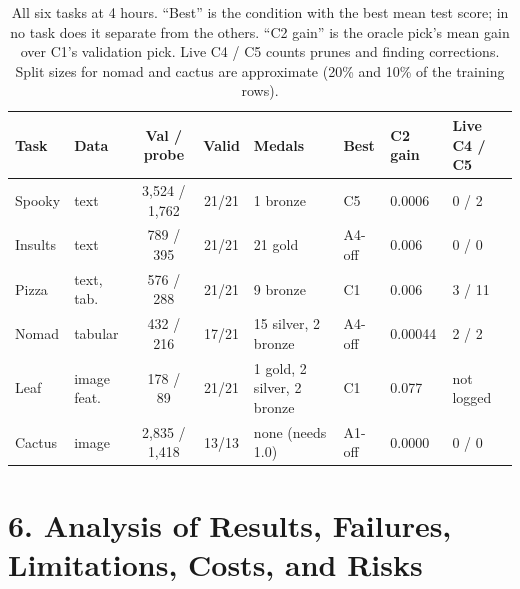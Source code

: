 \documentclass[11pt]{article}
\begin{document}
\begin{table}[tb]
\centering
\footnotesize
\begin{tabular}{@{}llccllll@{}}
\toprule
\textbf{Task} & \textbf{Data} & \textbf{Val / probe} & \textbf{Valid} & \textbf{Medals}
& \textbf{Best} & \textbf{C2 gain} & \textbf{Live C4 / C5} \\
\midrule
Spooky  & text       & 3,524 / 1,762 & 21/21 & 1 bronze            & C5     & 0.0006 & 0 / 2 \\
Insults & text       & 789 / 395     & 21/21 & 21 gold             & A4-off & 0.006  & 0 / 0 \\
Pizza   & text, tab. & 576 / 288     & 21/21 & 9 bronze            & C1     & 0.006  & 3 / 11 \\
Nomad   & tabular    & 432 / 216     & 17/21 & 15 silver, 2 bronze & A4-off & 0.00044 & 2 / 2 \\
Leaf    & image feat.& 178 / 89      & 21/21 & 1 gold, 2 silver, 2 bronze & C1 & 0.077 & not logged \\
Cactus  & image      & 2,835 / 1,418 & 13/13 & none (needs 1.0)    & A1-off & 0.0000 & 0 / 0 \\
\bottomrule
\end{tabular}
\caption{All six tasks at 4 hours. ``Best'' is the condition with the best mean test score;
in no task does it separate from the others. ``C2 gain'' is the oracle pick's mean gain
over C1's validation pick. Live C4 / C5 counts prunes and finding corrections. Split
sizes for nomad and cactus are approximate (20\% and 10\% of the training rows).}
\label{tab:tasks}
\end{table}

\section*{6. Analysis of Results, Failures, Limitations, Costs, and Risks}
\end{document}

